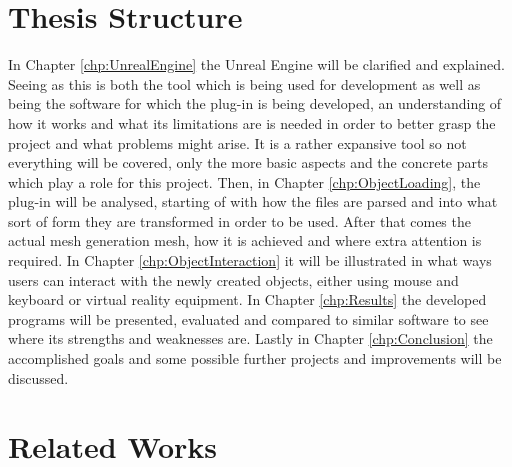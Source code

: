 \section{Thesis Structure}
In Chapter \ref{chp:UnrealEngine} the Unreal Engine will be clarified and explained. Seeing as this is both the tool which is being used for development as well as being the software for which the plug-in is being developed, an understanding of how it works and what its limitations are is needed in order to better grasp the project and what problems might arise. It is a rather expansive tool so not everything will be covered, only the more basic aspects and the concrete parts which play a role for this project. Then, in Chapter \ref{chp:ObjectLoading}, the plug-in will be analysed, starting of with how the files are parsed and into what sort of form they are transformed in order to be used. After that comes the actual mesh generation mesh, how it is achieved and where  extra attention is required. In Chapter \ref{chp:ObjectInteraction} it will be illustrated in what ways users can interact with the newly created objects, either using mouse and keyboard or virtual reality equipment. In Chapter \ref{chp:Results} the developed programs will be presented, evaluated and compared to similar software to see where its strengths and weaknesses are. Lastly in Chapter \ref{chp:Conclusion} the accomplished goals and some possible further projects and improvements will be discussed.

\section{Related Works}

